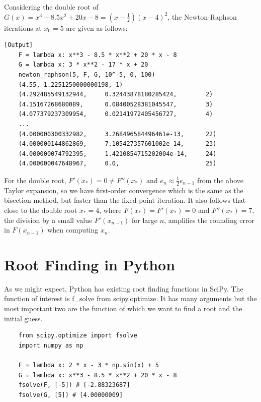 \documentclass{article}
\begin{document}
Considering the double root of \(G(x) = x^3 - 8.5x^2 + 20x - 8 = (x-\frac{1}{2})(x-4)^2\), the Newton-Raphson iterations at \(x_0 = 5\) are given as follows:

\begin{verbatim}[Output]
    F = lambda x: x**3 - 8.5 * x**2 + 20 * x - 8
    G = lambda x: 3 * x**2 - 17 * x + 20
    newton_raphson(5, F, G, 10^-5, 0, 100)
    (4.55, 1.2251250000000198, 1)
    (4.292485549132944,     0.32443878180285424,        2)
    (4.15167268680089,      0.08400528381045547,        3)
    (4.077379237309954,     0.02141972405456727,        4)
    ...
    (4.000000300332982,     3.268496584496461e-13,      22)
    (4.000000144862869,     7.105427357601002e-14,      23)
    (4.000000074792395,     1.4210854715202004e-14,     24)
    (4.000000047648967,     0.0,                        25)
\end{verbatim}

For the double root, \(F'(x_*) = 0 \neq F''(x_*)\) and \(e_n \approx \frac{1}{2}e_{n-1}\) from the above Taylor expansion, so we have first-order convergence which is the same as the bisection method, but faster than the fixed-point iteration. It also follows that close to the double root \(x_* = 4\), where \(F(x_*) = F'(x_*) = 0\) and \(F''(x_*) = 7\), the division by a small value \(F'(x_{n-1})\) for large \(n\), amplifies the rounding error in \(F(x_{n-1})\) when computing \(x_n\).

\section{Root Finding in Python}

As we might expect, Python has existing root finding functions in SciPy. The function of interest is f\_solve from scipy.optimize. It has many arguments but the most important two are the function of which we want to find a root and the initial guess.

\begin{verbatim}
    from scipy.optimize import fsolve
    import numpy as np
    
    F = lambda x: 2 * x - 3 * np.sin(x) + 5
    G = lambda x: x**3 - 8.5 * x**2 + 20 * x - 8
    fsolve(F, [-5]) # [-2.88323687]
    fsolve(G, [5]) # [4.00000009]
\end{verbatim}
\end{document}
